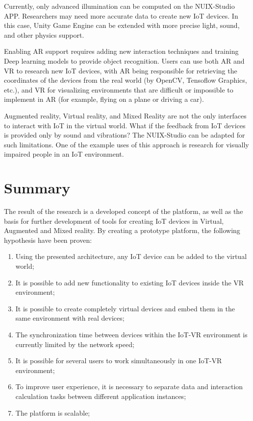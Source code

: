 Currently, only advanced illumination can be computed on the NUIX-Studio APP. Researchers may need more accurate data to create new IoT devices. In this case, Unity Game Engine can be extended with more precise light, sound, and other physics support.

Enabling AR support requires adding new interaction techniques and training Deep learning models to provide object recognition. Users can use both AR and VR to research new IoT devices, with AR being responsible for retrieving the coordinates of the devices from the real world (by OpenCV, Tensoflow Graphics, etc.), and VR for visualizing environments that are difficult or impossible to implement in AR (for example, flying on a plane or driving a car).

Augmented reality, Virtual reality, and Mixed Reality are not the only interfaces to interact with IoT in the virtual world. What if the feedback from IoT devices is provided only by sound and vibrations? The NUIX-Studio can be adapted for such limitations. One of the example uses of this approach is research for visually impaired people in an IoT environment.

\section{Summary}


The result of the research is a developed concept of the platform, as well as the basis for further development of tools for creating IoT devices in Virtual, Augmented and Mixed reality. By creating a prototype platform, the following hypothesis have been proven:

\begin{enumerate}
    \item Using the presented architecture, any IoT device can be added to the virtual world;
    \item It is possible to add new functionality to existing IoT devices inside the VR environment;
    \item It is possible to create completely virtual devices and embed them in the same environment with real devices;
    \item The synchronization time between devices within the IoT-VR environment is currently limited by the network speed;
    \item It is possible for several users to work simultaneously in one IoT-VR environment;
    \item To improve user experience, it is necessary to separate data and interaction calculation tasks between different application instances;
    \item The platform is scalable;
\end{enumerate}


